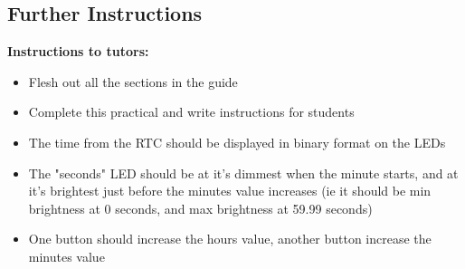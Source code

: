 \subsection{Further Instructions}
\textbf{Instructions to tutors:}
\begin{itemize}
    \item Flesh out all the sections in the guide
    \item Complete this practical and write instructions for students
    \item The time from the RTC should be displayed in binary format on the LEDs
    \item The "seconds" LED should be at it's dimmest when the minute starts, and at it's brightest just before the minutes value increases (ie it should be min brightness at 0 seconds, and max brightness at 59.99 seconds)
    \item One button should increase the hours value, another button increase the minutes value
\end{itemize}